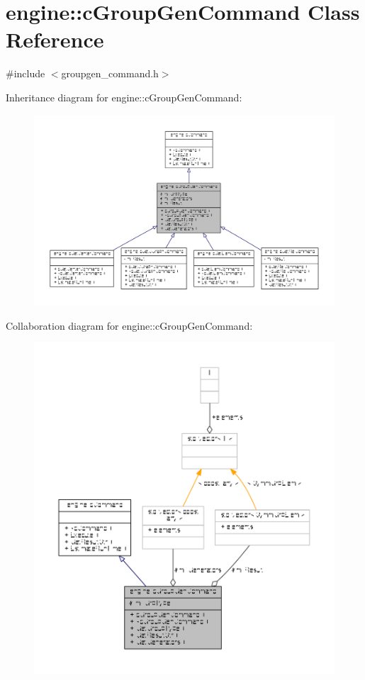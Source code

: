 \hypertarget{classengine_1_1cGroupGenCommand}{\section{engine\-:\-:c\-Group\-Gen\-Command Class Reference}
\label{classengine_1_1cGroupGenCommand}
}


{\ttfamily \#include $<$groupgen\-\_\-command.\-h$>$}



Inheritance diagram for engine\-:\-:c\-Group\-Gen\-Command\-:
\nopagebreak
\begin{figure}[H]
\begin{center}
\leavevmode
\includegraphics[width=350pt]{classengine_1_1cGroupGenCommand__inherit__graph}
\end{center}
\end{figure}


Collaboration diagram for engine\-:\-:c\-Group\-Gen\-Command\-:
\nopagebreak
\begin{figure}[H]
\begin{center}
\leavevmode
\includegraphics[width=350pt]{classengine_1_1cGroupGenCommand__coll__graph}
\end{center}
\end{figure}
